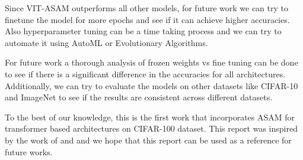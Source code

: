 \documentclass{article}
\begin{document}
Since VIT-ASAM outperforms all other models, for future work we can try to finetune the model for more epochs and see if it can achieve higher accuracies.
Also hyperparameter tuning can be a time taking process and we can try to automate it using AutoML or Evolutionary Algorithms.

For future work a thorough analysis of frozen weights vs fine tuning can be done to see if there is a significant difference in the accuracies for all architectures.
Additionally, we can try to evaluate the models on other datasets like CIFAR-10 and ImageNet to see if the results are consistent across different datasets.

To the best of our knowledge, this is the first work that incorporates ASAM for transformer based architectures on CIFAR-100 dataset.
This report was inspired by the work of \cite{DBLP:journals/corr/abs-2102-11600} and \cite{DBLP:journals/corr/abs-2103-14030} and we hope that this report can be used as a reference for future works.


\nocite{*}




\end{document}
